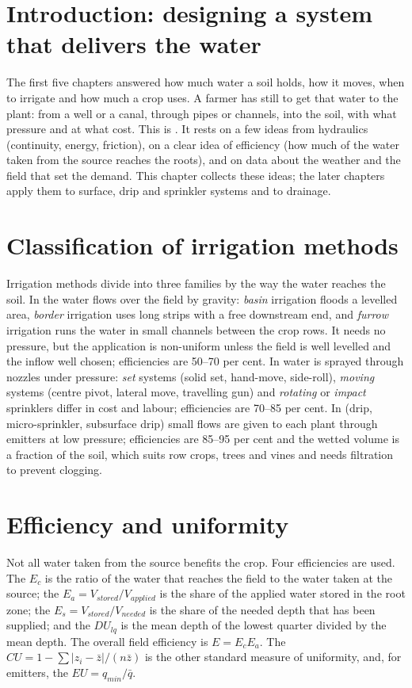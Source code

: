 \section{Introduction: designing a system that delivers the water}
The first five chapters answered how much water a soil holds, how it moves, when to irrigate and how much a crop uses. A farmer has still to get that water to the plant: from a well or a canal, through pipes or channels, into the soil, with what pressure and at what cost. This is . It rests on a few ideas from hydraulics (continuity, energy, friction), on a clear idea of efficiency (how much of the water taken from the source reaches the roots), and on data about the weather and the field that set the demand. This chapter collects these ideas; the later chapters apply them to surface, drip and sprinkler systems and to drainage.

\section{Classification of irrigation methods}
Irrigation methods divide into three families by the way the water reaches the soil. In  the water flows over the field by gravity: \emph{basin} irrigation floods a levelled area, \emph{border} irrigation uses long strips with a free downstream end, and \emph{furrow} irrigation runs the water in small channels between the crop rows. It needs no pressure, but the application is non-uniform unless the field is well levelled and the inflow well chosen; efficiencies are 50--70 per cent. In  water is sprayed through nozzles under pressure: \emph{set} systems (solid set, hand-move, side-roll), \emph{moving} systems (centre pivot, lateral move, travelling gun) and \emph{rotating} or \emph{impact} sprinklers differ in cost and labour; efficiencies are 70--85 per cent. In  (drip, micro-sprinkler, subsurface drip) small flows are given to each plant through emitters at low pressure; efficiencies are 85--95 per cent and the wetted volume is a fraction of the soil, which suits row crops, trees and vines and needs filtration to prevent clogging.

\section{Efficiency and uniformity}
Not all water taken from the source benefits the crop. Four efficiencies are used. The  $E_c$ is the ratio of the water that reaches the field to the water taken at the source; the  $E_a=V_{stored}/V_{applied}$ is the share of the applied water stored in the root zone; the  $E_s=V_{stored}/V_{needed}$ is the share of the needed depth that has been supplied; and the  $DU_{lq}$ is the mean depth of the lowest quarter divided by the mean depth. The overall field efficiency is $E=E_cE_a$. The  $CU=1-\sum|z_i-\bar z|/(n\bar z)$ is the other standard measure of uniformity, and, for emitters, the  $EU=q_{min}/\bar q$.

